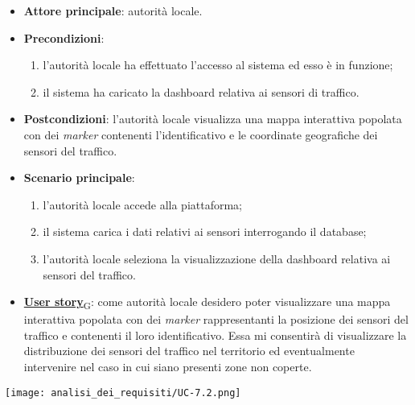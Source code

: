 \begin{itemize}
	\item \textbf{Attore principale}: autorità locale.
	\item \textbf{Precondizioni}:
	      \begin{enumerate}
		      \item l'autorità locale ha effettuato l'accesso al sistema ed esso è in funzione;
		      \item il sistema ha caricato la dashboard relativa ai sensori di traffico.
	      \end{enumerate}
	\item \textbf{Postcondizioni}: l'autorità locale visualizza una mappa interattiva popolata con dei \textit{marker} contenenti l'identificativo e le coordinate geografiche dei sensori del traffico.
	\item \textbf{Scenario principale}:
	      \begin{enumerate}
		      \item l'autorità locale accede alla piattaforma;
		      \item il sistema carica i dati relativi ai sensori interrogando il database;
		      \item l'autorità locale seleziona la visualizzazione della dashboard relativa ai sensori del traffico.
	      \end{enumerate}
	\item \href{https://7last.github.io/docs/rtb/documentazione-interna/glossario\#user-story}{\textbf{User story}\textsubscript{G}}:
	      come autorità locale desidero poter visualizzare una mappa interattiva popolata con dei \textit{marker} rappresentanti la posizione dei sensori del traffico
	      e contenenti il loro identificativo. Essa mi consentirà di visualizzare la distribuzione dei sensori del traffico nel territorio ed eventualmente intervenire nel caso in cui siano presenti zone non coperte.
\end{itemize}
\begin{center}
	\texttt{[image: analisi\_dei\_requisiti/UC-7.2.png]}
\end{center}


